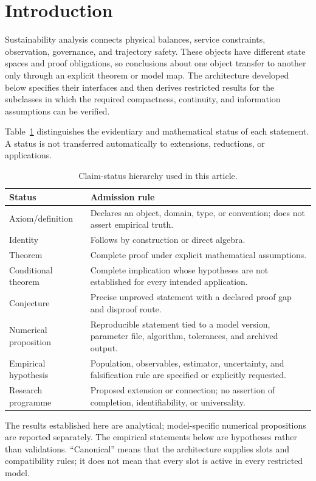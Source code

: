 \documentclass[11pt]{article}
\theoremstyle{definition}
\begin{document}
\section{Introduction}

Sustainability analysis connects physical balances, service constraints, observation, governance, and trajectory safety. These objects have different state spaces and proof obligations, so conclusions about one object transfer to another only through an explicit theorem or model map. The architecture developed below specifies their interfaces and then derives restricted results for the subclasses in which the required compactness, continuity, and information assumptions can be verified.

Table~\ref{tab:status} distinguishes the evidentiary and mathematical status of each statement. A status is not transferred automatically to extensions, reductions, or applications.

\begin{table}[h]
\centering
\small
\caption{Claim-status hierarchy used in this article.}
\label{tab:status}
\begin{tabularx}{\textwidth}{p{3.1cm}X}
\toprule
Status & Admission rule\\
\midrule
Axiom/definition & Declares an object, domain, type, or convention; does not assert empirical truth.\\
Identity & Follows by construction or direct algebra.\\
Theorem & Complete proof under explicit mathematical assumptions.\\
Conditional theorem & Complete implication whose hypotheses are not established for every intended application.\\
Conjecture & Precise unproved statement with a declared proof gap and disproof route.\\
Numerical proposition & Reproducible statement tied to a model version, parameter file, algorithm, tolerances, and archived output.\\
Empirical hypothesis & Population, observables, estimator, uncertainty, and falsification rule are specified or explicitly requested.\\
Research programme & Proposed extension or connection; no assertion of completion, identifiability, or universality.\\
\bottomrule
\end{tabularx}
\end{table}

The results established here are analytical; model-specific numerical propositions are reported separately. The empirical statements below are hypotheses rather than validations. ``Canonical'' means that the architecture supplies slots and compatibility rules; it does not mean that every slot is active in every restricted model.
\end{document}
